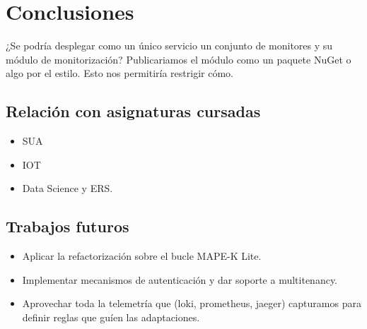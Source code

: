 \chapter{Conclusiones}
\label{chap:conclusiones}

¿Se podría desplegar como un único servicio un conjunto de monitores y su módulo de monitorización? Publicariamos el módulo como un paquete NuGet o algo por el estilo. Esto nos permitiría restrigir cómo.

\section{Relación con asignaturas cursadas}

\begin{itemize}
  \item SUA
  \item IOT
  \item Data Science y ERS.
\end{itemize}

\section{Trabajos futuros}

\begin{itemize}
  \item Aplicar la refactorización sobre el bucle MAPE-K Lite.
  \item Implementar mecanismos de autenticación y dar soporte a multitenancy.
  \item  Aprovechar toda la telemetría que (loki, prometheus, jaeger) capturamos para definir reglas que guíen las adaptaciones.
\end{itemize}
